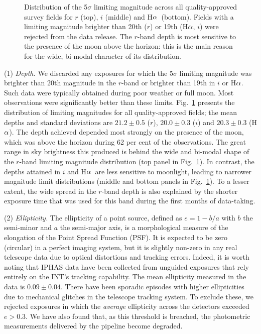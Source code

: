\documentclass[a4paper,useAMS,usenatbib]{mn2e}
\def\ha{\mbox{H$\rm \alpha$}}
\begin{document}
\begin{figure}
\begin{minipage}[b]{\linewidth}
    \end{minipage}
    \caption{Distribution of the 5$\sigma$ limiting magnitude
             across all quality-approved survey fields
             for $r$ (top), $i$ (middle) and \ha\ (bottom).
             Fields with a limiting magnitude brighter than
             20th ($r$) or 19th (\ha, $i$) were rejected
             from the data release.
             The $r$-band depth is most sensitive 
             to the presence of the moon above the horizon: 
             this is the main reason for the wide, bi-modal character
             of its distribution.}
    \label{fig:depth}
\end{figure}

(1) \emph{Depth.} 
We discarded any exposures for which the $5\sigma$ limiting magnitude 
was brighter than 20th magnitude in the $r$-band
or brighter than 19th in $i$ or \ha. 
Such data were typically obtained during poor weather or full moon.
Most observations were significantly better than these limits.
Fig.~\ref{fig:depth} presents the distribution of limiting magnitudes
for all quality-approved fields;
the mean depths and standard deviations are 
$21.2\pm0.5$ ($r$), $20.0\pm0.3$ ($i$) and $20.3\pm0.3$ (\ha).
The depth achieved depended
most strongly on the presence of the moon,
which was above the horizon during 62 per cent 
of the observations.
The great range in sky brightness this
produced is behind the wide and bi-modal shape
of the $r$-band limiting magnitude distribution 
(top panel in Fig.~\ref{fig:depth}).
In contrast, the depths attained in $i$ and \ha\ 
are less sensitive to moonlight, leading to
narrower magnitude limit distributions
(middle and bottom panels in Fig.~\ref{fig:depth}).
To a lesser extent, the wide spread in the $r$-band depth
is also explained by the shorter exposure time
that was used for this band during the first months of data-taking.

(2) \emph{Ellipticity.} 
The ellipticity of a point source,
defined as $e = 1 - b / a$ 
with $b$ the semi-minor and $a$ the semi-major axis,
is a morphological measure of the elongation
of the Point Spread Function (PSF).
It is expected to be zero (circular)
in a perfect imaging system,
but it is slightly non-zero in any real telescope data 
due to optical distortions and tracking errors.
Indeed, it is worth noting
that IPHAS data have been collected
from unguided exposures that rely entirely
on the INT's tracking capability.
The mean ellipticity measured
in the data is $0.09\pm0.04$.
There have been sporadic episodes with higher ellipticities
due to mechanical glitches in the telescope tracking system.
To exclude these, we rejected exposures
in which the \emph{average} ellipticity
across the detectors exceeded $e > 0.3$.
We have also found that, as this threshold is breached,
the photometric measurements delivered by the pipeline become degraded.
\end{document}
